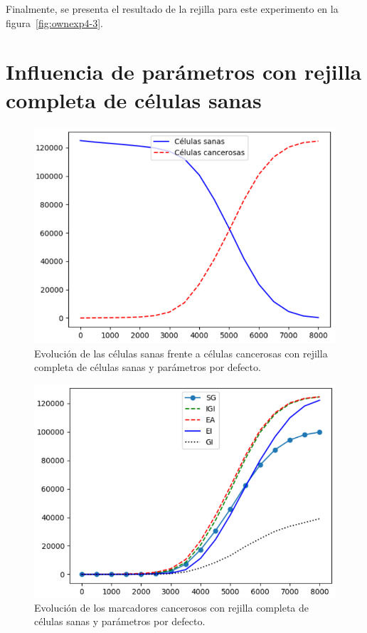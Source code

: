 Finalmente, se presenta el resultado de la rejilla para este experimento en la figura~\ref{fig:ownexp4-3}.

\clearpage

\section{Influencia de parámetros con rejilla completa de células sanas}

\begin{figure}[h]
\centering
\includegraphics[scale=0.8]{figures/experiments/exp5/healthvscarcino}
\caption{Evolución de las células sanas frente a células cancerosas con rejilla completa de células sanas y parámetros por defecto.}
\end{figure}

\begin{figure}[h]
\centering
\includegraphics[scale=0.8]{figures/experiments/exp5/mutations}
\caption{Evolución de los marcadores cancerosos con rejilla completa de células sanas y parámetros por defecto.}
\end{figure}

